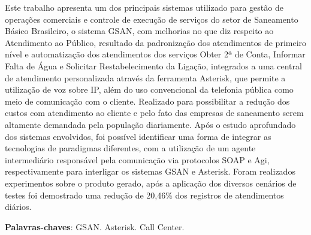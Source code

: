 \setlength{\absparsep}{18pt} %
\begin{resumo}
 
Este trabalho apresenta um dos principais sistemas utilizado para gestão de operações comerciais e controle de execução de serviços do setor de Saneamento Básico Brasileiro, o sistema GSAN, com melhorias no que diz respeito ao Atendimento ao Público, resultado da padronização dos atendimentos de primeiro nível e automatização dos atendimentos dos serviços Obter 2ª de Conta, Informar Falta de Água e Solicitar Restabelecimento da Ligação, integrados a uma central de atendimento personalizada através da ferramenta Asterisk, que permite a utilização de voz sobre IP, além do uso convencional da telefonia pública como meio de comunicação com o cliente. Realizado para possibilitar a redução dos custos com atendimento ao cliente e pelo fato das empresas de saneamento serem altamente demandada pela população diariamente. Após o estudo aprofundado dos sistemas envolvidos, foi possível identificar uma forma de integrar as tecnologias de paradigmas diferentes, com a utilização de um agente intermediário responsável pela comunicação via protocolos SOAP e Agi, respectivamente para interligar os sistemas GSAN e Asterisk.  Foram realizados experimentos sobre o produto gerado, após a aplicação dos diversos cenários de testes foi demostrado uma redução de 20,46\% dos registros de atendimentos diários.


 \textbf{Palavras-chaves}: GSAN. Asterisk. Call Center.
\end{resumo}